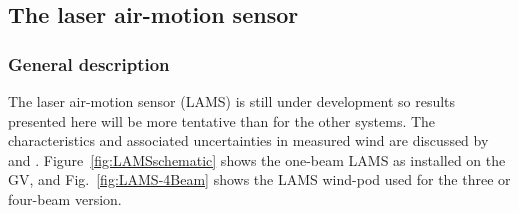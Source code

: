 \documentclass[12pt,twoside,english]{article}\usepackage[]{graphicx}\usepackage[]{color}
\let\OrgIndex\index
\renewcommand*{\index}[1]{\OrgIndex{#1}}
\begin{document}
\subsection{The laser air-motion sensor\label{sub:LAMS-description}}

\subsubsection{General description}

The laser air-motion sensor (LAMS) is still under development so results presented here will be more tentative than for the other systems. The characteristics and associated uncertainties in measured wind are discussed by \citet{SpulerEtAl2011} and \citet{CooperEtAl2014}. Figure~\ref{fig:LAMSschematic} shows the one-beam LAMS as installed on the GV, and Fig.~\ref{fig:LAMS-4Beam} shows the LAMS wind-pod used for the three or four-beam version.
\end{document}
